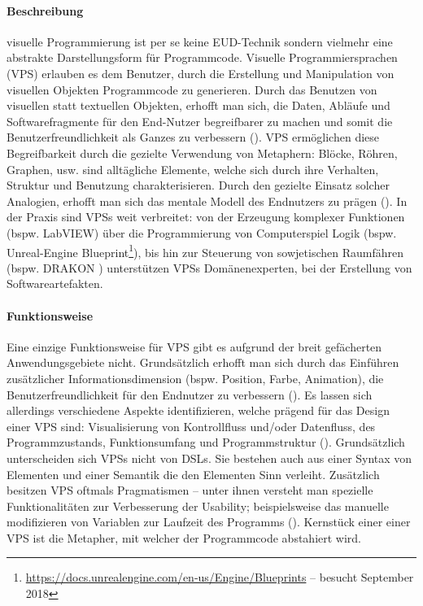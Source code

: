 \paragraph{Beschreibung} visuelle Programmierung ist per se keine \ac{EUD}-Technik sondern vielmehr eine abstrakte Darstellungsform für Programmcode. Visuelle Programmiersprachen (VPS)  erlauben es dem Benutzer, durch die Erstellung und Manipulation von visuellen Objekten Programmcode zu generieren. Durch das Benutzen von visuellen statt textuellen Objekten, erhofft man sich, die Daten, Abläufe und Softwarefragmente für den End-Nutzer begreifbarer zu machen und somit die Benutzerfreundlichkeit als Ganzes zu verbessern (\cite{burnett2002software}). \ac{VPS} ermöglichen diese Begreifbarkeit durch die gezielte Verwendung von Metaphern: Blöcke, Röhren, Graphen, usw. sind alltägliche Elemente, welche sich durch ihre Verhalten, Struktur und Benutzung charakterisieren. Durch den gezielte Einsatz solcher Analogien, erhofft man sich das mentale Modell des Endnutzers zu prägen (\cite{Myers1986vis}). In der Praxis sind \acp{VPS} weit verbreitet: von der Erzeugung komplexer Funktionen (bspw. LabVIEW) über die Programmierung von Computerspiel Logik (bspw. Unreal-Engine Blueprint\footnote{\url{https://docs.unrealengine.com/en-us/Engine/Blueprints} -- besucht September 2018}), bis hin zur Steuerung von sowjetischen Raumfähren (bspw. DRAKON \cite{parondzhanov1995drakon}) unterstützen \acp{VPS} Domänenexperten, bei der Erstellung von Softwareartefakten. 

\paragraph{Funktionsweise} Eine einzige Funktionsweise für \ac{VPS} gibt es aufgrund der breit gefächerten Anwendungsgebiete nicht. Grundsätzlich erhofft man sich durch das Einführen zusätzlicher Informationsdimension (bspw. Position, Farbe, Animation), die Benutzerfreundlichkeit für den Endnutzer zu verbessern (\cite{Myers1986vis}). Es lassen sich allerdings verschiedene Aspekte identifizieren, welche prägend für das Design einer \ac{VPS} sind: Visualisierung von Kontrollfluss und/oder Datenfluss, des Programmzustands, Funktionsumfang und Programmstruktur (\cite{boshernitsan2004visual}). Grundsätzlich unterscheiden sich \acp{VPS} nicht von \acp{DSL}. Sie bestehen auch aus einer Syntax von Elementen und einer Semantik die den Elementen Sinn verleiht. Zusätzlich besitzen \ac{VPS} oftmals Pragmatismen -- unter ihnen versteht man spezielle Funktionalitäten zur Verbesserung der Usability; beispielsweise das manuelle modifizieren von Variablen zur Laufzeit des Programms (\cite{Repenning2017MovingBS}). Kernstück einer einer \ac{VPS} ist die Metapher, mit welcher der Programmcode abstahiert wird. 

